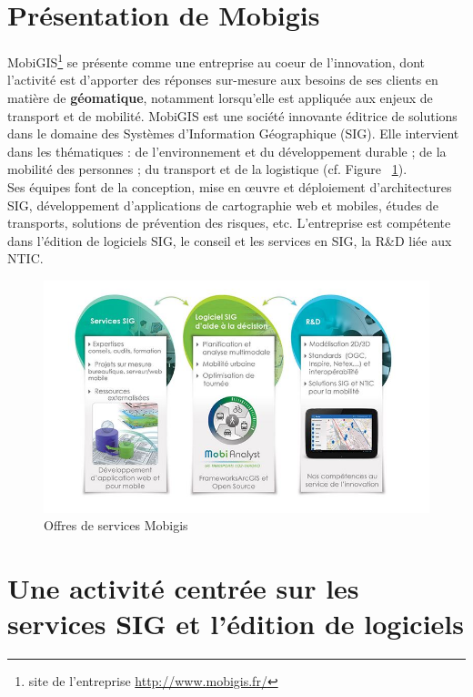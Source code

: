 \section{Présentation de Mobigis}

MobiGIS\footnote{site de l’entreprise \url{http://www.mobigis.fr/}} se présente comme une entreprise au coeur de l’innovation, dont l’activité est d’apporter des réponses sur-mesure aux besoins de ses clients en matière de \textbf{géomatique}, notamment lorsqu’elle est appliquée aux enjeux de transport et de mobilité. MobiGIS est une société innovante éditrice de solutions dans le domaine des Systèmes d’Information Géographique (SIG). 
Elle intervient dans les thématiques : de l’environnement et du développement durable ; de la mobilité des personnes ; du transport et de la logistique (cf. Figure ~\ref{fig:fig1}).\\

Ses équipes font de la conception, mise en \oe uvre et déploiement d'architectures SIG, développement d’applications de cartographie web et mobiles, études de transports, solutions de prévention des risques, etc. L’entreprise est compétente dans l’édition de logiciels SIG, le conseil et les services en SIG, la R\&D liée aux NTIC.\\

\begin{figure}[!h]\label{fig:fig1}
\centering
\includegraphics[width=12cm]{images/fig1_solutionsMobigis.JPG}
\caption{Offres de services Mobigis}
\end{figure} 

\section{Une activité centrée sur les services SIG et l'édition de logiciels}

